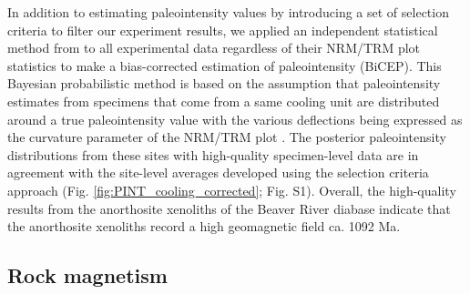 In addition to estimating paleointensity values by introducing a set of selection criteria to filter our experiment results, we applied an independent statistical method from \citealp{Cych2021a} to all experimental data regardless of their NRM/TRM plot statistics to make a bias-corrected estimation of paleointensity (BiCEP). This Bayesian probabilistic method is based on the assumption that paleointensity estimates from specimens that come from a same cooling unit are distributed around a true paleointensity value with the various deflections being expressed as the curvature parameter of the NRM/TRM plot \citep{Paterson2011a}. The posterior paleointensity distributions from these sites with high-quality specimen-level data are in agreement with the site-level averages developed using the selection criteria approach (Fig. \ref{fig:PINT_cooling_corrected}; Fig. S1). Overall, the high-quality results from the anorthosite xenoliths of the Beaver River diabase indicate that the anorthosite xenoliths record a high geomagnetic field ca. 1092 Ma. 

\subsection*{Rock magnetism}
